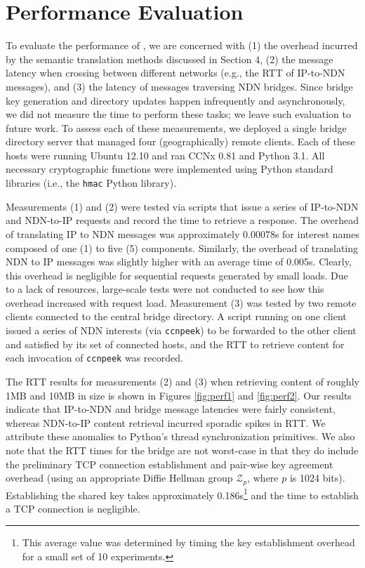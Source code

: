 \section{Performance Evaluation}
To evaluate the performance of \sink, we are concerned with (1) the overhead incurred by the semantic translation methods discussed in Section 4, (2) the message latency when crossing between different networks (e.g., the RTT of IP-to-NDN messages), and (3) the latency of messages traversing NDN bridges. Since bridge key generation and directory updates happen infrequently and asynchronously, we did not measure the time to perform these tasks; we leave such evaluation to future work. To assess each of these measurements, we deployed a single bridge directory server that managed four (geographically) remote clients. Each of these hosts were running Ubuntu 12.10 and ran CCNx 0.81 and Python 3.1. All necessary cryptographic functions were implemented using Python standard libraries (i.e., the {\tt hmac} Python library). 

Measurements (1) and (2) were tested via scripts that issue a series of IP-to-NDN and NDN-to-IP requests and record the time to retrieve a response. The overhead of translating IP to NDN messages was approximately 0.00078s for interest names composed of one (1) to five (5) components. Similarly, the overhead of translating NDN to IP messages was slightly higher with an average time of 0.005s. Clearly, this overhead is negligible for sequential requests generated by small loads. Due to a lack of resources, large-scale tests were not conducted to see how this overhead increased with request load. Measurement (3) was tested by two remote clients connected to the central bridge directory. A script running on one client issued a series of NDN interests (via {\tt ccnpeek}) to be forwarded to the other client and satisfied by its set of connected hosts, and the RTT to retrieve content for each invocation of {\tt ccnpeek} was recorded. 

The RTT results for measurements (2) and (3) when retrieving content of roughly 1MB and 10MB in size is shown in Figures \ref{fig:perf1} and \ref{fig:perf2}. Our results indicate that IP-to-NDN and bridge message latencies were fairly consistent, whereas NDN-to-IP content retrieval incurred sporadic spikes in RTT. We attribute these anomalies to Python's thread synchronization primitives. We also note that the RTT times for the bridge are not worst-case in that they do include the preliminary TCP connection establishment and pair-wise key agreement overhead (using an appropriate Diffie Hellman group $\mathcal{Z}_p$, where $p$ is 1024 bits). Establishing the shared key takes approximately 0.186s\footnote{This average value was determined by timing the key establishment overhead for a small set of 10 experiments.} and the time to establish a TCP connection is negligible.

